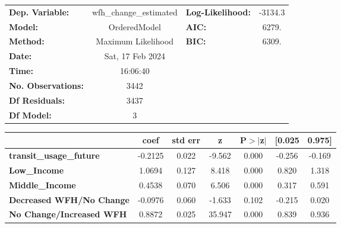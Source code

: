 \documentclass{report}
\begin{document}
\begin{center}
\begin{tabular}{lclc}
\toprule
\textbf{Dep. Variable:}          & wfh\_change\_estimated & \textbf{  Log-Likelihood:    } &   -3134.3   \\
\textbf{Model:}                  &      OrderedModel      & \textbf{  AIC:               } &     6279.   \\
\textbf{Method:}                 &   Maximum Likelihood   & \textbf{  BIC:               } &     6309.   \\
\textbf{Date:}                   &    Sat, 17 Feb 2024    & \textbf{                     } &             \\
\textbf{Time:}                   &        16:06:40        & \textbf{                     } &             \\
\textbf{No. Observations:}       &           3442         & \textbf{                     } &             \\
\textbf{Df Residuals:}           &           3437         & \textbf{                     } &             \\
\textbf{Df Model:}               &              3         & \textbf{                     } &             \\
\bottomrule
\end{tabular}
\begin{tabular}{lcccccc}
                                 & \textbf{coef} & \textbf{std err} & \textbf{z} & \textbf{P$> |$z$|$} & \textbf{[0.025} & \textbf{0.975]}  \\
\midrule
\textbf{transit\_usage\_future}  &      -0.2125  &        0.022     &    -9.562  &         0.000        &       -0.256    &       -0.169     \\
\textbf{Low\_Income}             &       1.0694  &        0.127     &     8.418  &         0.000        &        0.820    &        1.318     \\
\textbf{Middle\_Income}          &       0.4538  &        0.070     &     6.506  &         0.000        &        0.317    &        0.591     \\
\textbf{Decreased WFH/No Change} &      -0.0976  &        0.060     &    -1.633  &         0.102        &       -0.215    &        0.020     \\
\textbf{No Change/Increased WFH} &       0.8872  &        0.025     &    35.947  &         0.000        &        0.839    &        0.936     \\
\bottomrule
\end{tabular}
\end{center}
\end{document}
